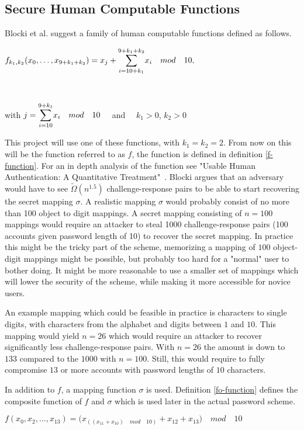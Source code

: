 \subsection{Secure Human Computable Functions}
Blocki et al. \cite{hcp-blocki} suggest a family of human computable functions defined as follows.
\centerline{ $ f_{k_1,k_2}(x_0,\dots,x_{9+k_1+k_2})= x_j + \mathlarger{\sum}\limits^{9+k_1+k_2}_{i=10+k_1} x_i \quad mod\quad 10,$}\\
\centerline{with $j = \mathlarger{\sum}\limits^{9+k_1}_{i=10} x_i \quad mod \quad 10\quad$ and $\quad k_1>0$, $k_2>0$ }
\vspace{2mm}
\par This project will use one of these functions, with $k_1=k_2=2$. From now on this will be the function referred to as $f$, the function is defined in definition \ref{f-function}. For an in depth analysis of the function see "Usable Human Authentication: A Quantitative Treatment"~\cite{Blocki2014}. Blocki argues that an adversary would have to see $\tilde \Omega(n^{1.5})$ challenge-response pairs to be able to start recovering the secret mapping $\sigma$. A realistic mapping $\sigma$ would probably consist of no more than 100 object to digit mappings. A secret mapping consisting of $n=100$ mappings would require an attacker to steal 1000 challenge-response pairs (100 accounts given password length of 10) to recover the secret mapping. In practice this might be the tricky part of the scheme, memorizing a mapping of $100$ object-digit mappings might be possible, but probably too hard for a "normal" user to bother doing. It might be more reasonable to use a smaller set of mappings which will lower the security of the scheme, while making it more accessible for novice users. 
\par An example mapping which could be feasible in practice is characters to single digits, with characters from the alphabet and digits between $1$ and $10$. This mapping would yield $n=26$ which would require an attacker to recover significantly less challenge-response pairs. With $n=26$ the amount is down to $133$ compared to the $1000$ with $n=100$. Still, this would require to fully compromise $13$ or more accounts with password lengths of $10$ characters. 
\par In addition to $f$, a mapping function $\sigma$ is used. Definition \ref{fo-function} defines the composite function of $f$ and $\sigma$ which is used later in the actual password scheme.


\begin{definition}
    \label{f-function}
    $f(x_0,x_2,\dots,x_{13}) = \big( x_{(( x_{11} + x_{10} )\quad mod \quad 10)} + x_{12} + x_{13} \big)\quad mod \quad 10$ 
\end{definition} 

